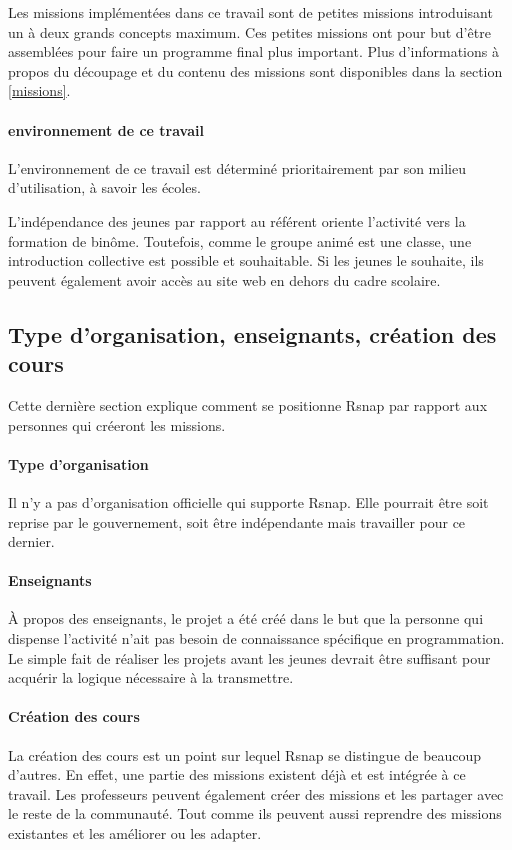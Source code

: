 Les missions implémentées dans ce travail sont de petites missions introduisant un à deux grands concepts maximum. Ces petites missions ont pour but d'être assemblées pour faire un programme final plus important. Plus d'informations à propos du découpage et du contenu des missions sont disponibles dans la section \ref{missions}.

\paragraph{environnement de ce travail}
L'environnement de ce travail est déterminé prioritairement par son milieu d'utilisation, à savoir les écoles.

L'indépendance des jeunes par rapport au référent oriente l'activité vers la formation de binôme. Toutefois, comme le groupe animé est une classe, une introduction collective est possible et souhaitable.
Si les jeunes le souhaite, ils peuvent également avoir accès au site web en dehors du cadre scolaire.

\subsection{Type d'organisation, enseignants, création des cours}
Cette dernière section explique comment se positionne \gls{Rsnap} par rapport aux personnes qui créeront les missions.

\paragraph{Type d'organisation}
Il n'y a pas d'organisation officielle qui supporte \gls{Rsnap}. Elle pourrait être soit reprise par le gouvernement, soit être indépendante mais travailler pour ce dernier.

\paragraph{Enseignants}
À propos des enseignants, le projet a été créé dans le but que la personne qui dispense l'activité n'ait pas besoin de connaissance spécifique en programmation. Le simple fait de réaliser les projets avant les jeunes devrait être suffisant pour acquérir la logique nécessaire à la transmettre.

\paragraph{Création des cours}
La création des cours est un point sur lequel \gls{Rsnap} se distingue de beaucoup d'autres. En effet, une partie des missions existent déjà et est intégrée à ce travail. Les professeurs peuvent également créer des missions et les partager avec le reste de la communauté. Tout comme ils peuvent aussi reprendre des missions existantes et les améliorer ou les adapter.

